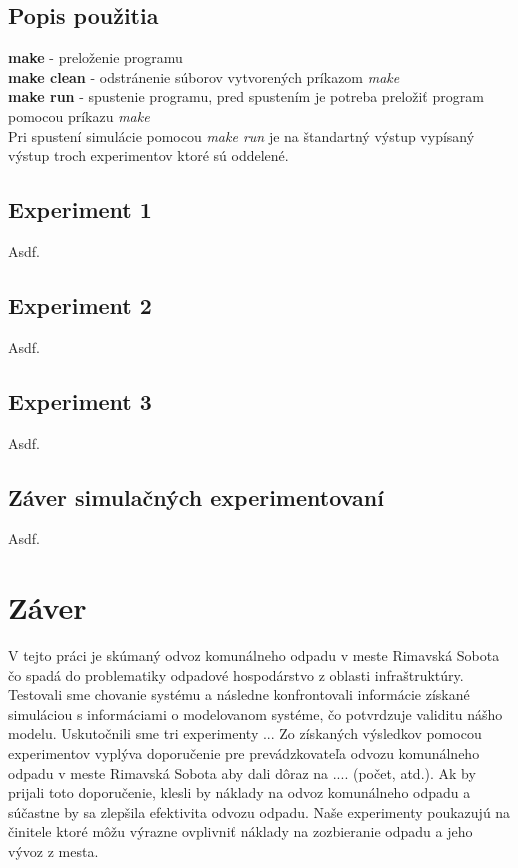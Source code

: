 \documentclass[11pt,a4paper]{article}
\begin{document}
    \subsection{Popis použitia}

        \noindent \textbf{make} - preloženie programu\\[0.4em]
        \noindent \textbf{make clean} - odstránenie súborov vytvorených príkazom \textit{make}\\[0.4em]
        \noindent \textbf{make run} - spustenie programu, pred spustením je potreba preložiť program pomocou príkazu \textit{make}\\

        \noindent Pri spustení simulácie pomocou \textit{make run} je na štandartný výstup vypísaný výstup troch experimentov ktoré sú oddelené.

    \subsection{Experiment 1}

        Asdf.

    \subsection{Experiment 2}

        Asdf.

    \subsection{Experiment 3}

        Asdf.

    \subsection{Záver simulačných experimentovaní}

        Asdf.

\section{Záver}

    \indent V tejto práci je skúmaný odvoz komunálneho odpadu v meste Rimavská Sobota čo spadá do problematiky odpadové hospodárstvo z oblasti infraštruktúry. Testovali sme chovanie systému a následne konfrontovali informácie získané simuláciou s informáciami o modelovanom systéme, čo potvrdzuje validitu nášho modelu. Uskutočnili sme tri experimenty ... Zo získaných výsledkov pomocou experimentov vyplýva doporučenie pre prevádzkovateľa odvozu komunálneho odpadu v meste Rimavská Sobota aby dali dôraz na .... (počet, atd.). Ak by prijali toto doporučenie, klesli by náklady na odvoz komunálneho odpadu a súčastne by sa zlepšila efektivita odvozu odpadu. Naše experimenty poukazujú na činitele ktoré môžu výrazne ovplivniť náklady na zozbieranie odpadu a jeho vývoz z mesta.
\end{document}
